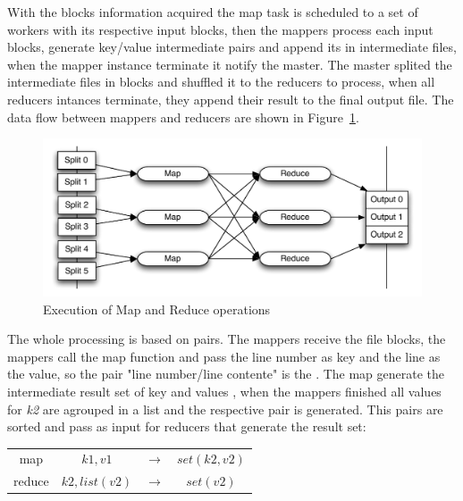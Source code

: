 With the blocks information acquired the map task is scheduled to a set of workers
with its respective input blocks, then the mappers process each input blocks, 
generate key/value intermediate pairs and append its in intermediate files, when
the mapper instance terminate it notify the master. The master splited the intermediate
files in blocks and shuffled it to the reducers to process, when all reducers
intances terminate, they append their result to the final output file. The data
flow between mappers and reducers are shown in Figure~\ref{fig:mrexecute}.


\begin{figure}[htbp]
	\centering
	\includegraphics[width=\columnwidth]{img/mapreduce-en.pdf}
	\caption{Execution of Map and Reduce operations}\label{fig:mrexecute}
\end{figure}

The whole processing is based on  pairs. The mappers receive the
file blocks, the mappers call the map function and pass the line number as key and
the line as the value, so the pair "line number/line contente" is the .
The map generate the intermediate result set of key and values , 
when the mappers finished all values for \textit{k2} are agrouped in a list and
the respective pair  is generated. This pairs are sorted and
pass as input for reducers that generate the result set:

\begin{center}
\begin{tabular}{c c c c}
	\hline
	   map & $k1,v1$ & $\rightarrow$  & $set(k2, v2)$ \\
	   reduce & $k2, list(v2)$ & $\rightarrow$ & $set(v2)$ \\
	\hline
\end{tabular}
\end{center}

